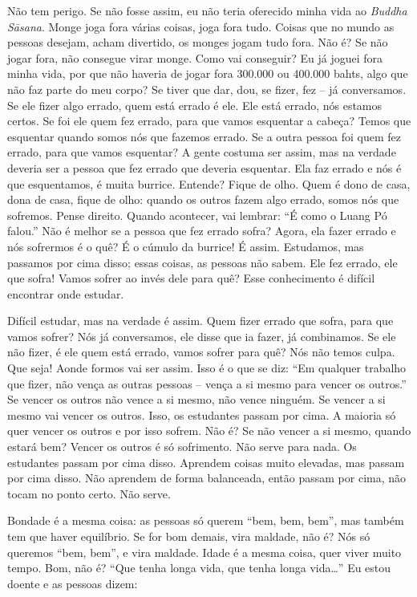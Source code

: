 Não tem perigo. Se não fosse assim, eu não teria oferecido minha
vida ao \textit{Buddha Sāsana}. Monge joga fora várias coisas, joga
fora tudo. Coisas que no mundo as pessoas desejam, acham divertido, os
monges jogam tudo fora. Não é? Se não jogar fora, não consegue virar
monge. Como vai conseguir? Eu já joguei fora minha vida, por que não
haveria de jogar fora 300.000 ou 400.000 bahts, algo que não faz parte
do meu corpo? Se tiver que dar, dou, se fizer, fez – já conversamos. Se
ele fizer algo errado, quem está errado é ele. Ele está errado, nós
estamos certos. Se foi ele quem fez errado, para que vamos esquentar a
cabeça? Temos que esquentar quando somos nós que fazemos errado. Se a
outra pessoa foi quem fez errado, para que vamos esquentar? A gente
costuma ser assim, mas na verdade deveria ser a pessoa que fez errado
que deveria esquentar. Ela faz errado e nós é que esquentamos, é muita
burrice. Entende? Fique de olho. Quem é dono de casa, dona de casa,
fique de olho: quando os outros fazem algo errado, somos nós que
sofremos. Pense direito. Quando acontecer, vai lembrar: “É como o Luang
Pó falou.” Não é melhor se a pessoa que fez errado sofra? Agora, ela
fazer errado e nós sofrermos é o quê? É o cúmulo da burrice! É assim.
Estudamos, mas passamos por cima disso; essas coisas, as pessoas não
sabem. Ele fez errado, ele que sofra! Vamos sofrer ao invés dele para
quê? Esse conhecimento é difícil encontrar onde estudar.

Difícil estudar, mas na verdade é assim. Quem fizer errado que
sofra, para que vamos sofrer? Nós já conversamos, ele disse que ia
fazer, já combinamos. Se ele não fizer, é ele quem está errado, vamos
sofrer para quê? Nós não temos culpa. Que seja! Aonde formos vai ser
assim. Isso é o que se diz: “Em qualquer trabalho que fizer, não vença
as outras pessoas – vença a si mesmo para vencer os outros.” Se vencer
os outros não vence a si mesmo, não vence ninguém. Se vencer a si mesmo
vai vencer os outros. Isso, os estudantes passam por cima. A maioria só
quer vencer os outros e por isso sofrem. Não é? Se não vencer a si
mesmo, quando estará bem? Vencer os outros é só sofrimento. Não serve
para nada. Os estudantes passam por cima disso. Aprendem coisas muito
elevadas, mas passam por cima disso. Não aprendem de forma balanceada,
então passam por cima, não tocam no ponto certo. Não serve.

Bondade é a mesma coisa: as pessoas só querem “bem, bem, bem”, mas
também tem que haver equilíbrio. Se for bom demais, vira maldade, não
é? Nós só queremos “bem, bem”, e vira maldade. Idade é a mesma coisa,
quer viver muito tempo. Bom, não é? “Que tenha longa vida, que tenha
longa vida…” Eu estou doente e as pessoas dizem: 

